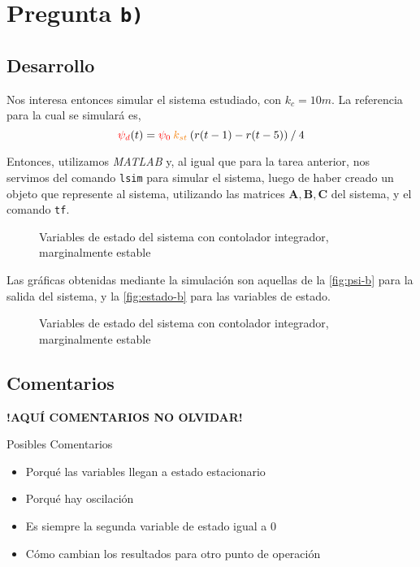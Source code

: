 \section{Pregunta \texttt{b)}}\label{pregunta-b}

\subsection{Desarrollo}

Nos interesa entonces simular el sistema estudiado, con $k_{c} = 10\unit{m}$.
La referencia para la cual se simulará es,
\begin{equation}
  \rojo{\psi_{d}}(t) = \rojo{\psi_{0}}\nara{k_{st}}\left(r(t-1) - r(t-5)\right) \mathbin{/} 4
  \label{eq:referencia}
\end{equation}

Entonces, utilizamos \textit{MATLAB} y, al igual que para la tarea anterior,
nos servimos del comando \verb|lsim| para simular el sistema, luego de haber
creado un objeto que represente al sistema, utilizando las matrices
$\mathbf{A}, \mathbf{B}, \mathbf{C}$ del sistema, y el comando \verb|tf|.

\begin{figure}[ht]
  \centering
  
  \caption{Variables de estado del sistema con contolador integrador, marginalmente estable}
  \label{fig:psi-b}
\end{figure}

Las gráficas obtenidas mediante la simulación son aquellas de la \autoref{fig:psi-b} para
la salida del sistema, y la \autoref{fig:estado-b} para las variables de estado.

\begin{figure}[ht]
  \centering
  
  \caption{Variables de estado del sistema con contolador integrador, marginalmente estable}
  \label{fig:estado-b}
\end{figure}

\FloatBarrier
\subsection{Comentarios}


\textbf{!AQUÍ COMENTARIOS NO OLVIDAR!}

Posibles Comentarios
\begin{itemize}
  \item Porqué las variables llegan a estado estacionario
  \item Porqué hay oscilación
  \item Es siempre la segunda variable de estado igual a 0
  \item Cómo cambian los resultados para otro punto de operación
\end{itemize}